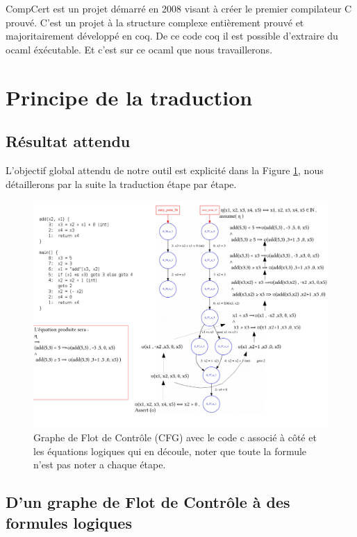 	CompCert est un projet démarré en 2008 visant à créer le premier compilateur C prouvé.
C'est un projet à la structure complexe entièrement prouvé et majoritairement développé en coq.
De ce code coq il est possible d'extraire du ocaml éxécutable. Et c'est sur ce ocaml que nous travaillerons.


\section{Principe de la traduction} 
\label{sec:1}
\subsection{Résultat attendu}
L'objectif global attendu de notre outil est explicité dans la Figure \ref{fig:1}, nous détaillerons par la suite la traduction étape par étape. 

\begin{figure}
  \includegraphics[width=1.2\textwidth]{file_pdf/presentation_no_assert4.pdf} 
\caption{\label{fig:1} Graphe de Flot de Contrôle (CFG) avec le code c associé à côté et les équations logiques qui en découle, noter que toute la formule n'est pas noter a chaque étape.}

\end{figure}


\label{sec:2}
\subsection{D'un graphe de Flot de Contrôle à des formules logiques}



